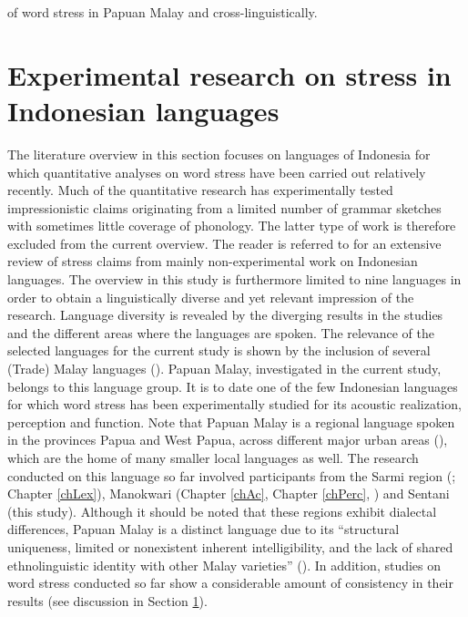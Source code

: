of word stress in Papuan Malay and cross-linguistically.

\section{Experimental research on stress in Indonesian languages} \label{sec52}
The literature overview in this section focuses on languages of Indonesia for which quantitative analyses on word stress have been carried out relatively recently. Much of the quantitative research has experimentally tested impressionistic claims originating from a limited number of grammar sketches with sometimes little coverage of phonology. The latter type of work is therefore excluded from the current overview. The reader is referred to \citet{ode_perception_1994} for an extensive review of stress claims from mainly non-experimental work on Indonesian languages. The overview in this study is furthermore limited to nine languages in order to obtain a linguistically diverse and yet relevant impression of the research. Language diversity is revealed by the diverging results in the studies and the different areas where the languages are spoken. The relevance of the selected languages for the current study is shown by the inclusion of several (Trade) Malay languages (\citealt{paauw_malay_2009}). Papuan Malay, investigated in the current study, belongs to this language group. It is to date one of the few Indonesian languages for which word stress has been experimentally studied for its acoustic realization, perception and function. Note that Papuan Malay is a regional language spoken in the provinces Papua and West Papua, across different major urban areas (\citealt[xxiv]{kluge_grammar_2017}), which are the home of many smaller local languages as well. The research conducted on this language so far involved participants from the Sarmi region (\citealt{kluge_grammar_2017}; Chapter \ref{chLex}), Manokwari (Chapter \ref{chAc}, Chapter \ref{chPerc}, \citealt{kaland_demarcating_2020}) and Sentani (this study). Although it should be noted that these regions exhibit dialectal differences, Papuan Malay is a distinct language due to its ``structural uniqueness, limited or nonexistent inherent intelligibility, and the lack of shared ethnolinguistic identity with other Malay varieties'' (\citealt[9]{kluge_grammar_2017}). In addition, studies on word stress conducted so far show a considerable amount of consistency in their results (see discussion in Section \ref{sec52}).\par

